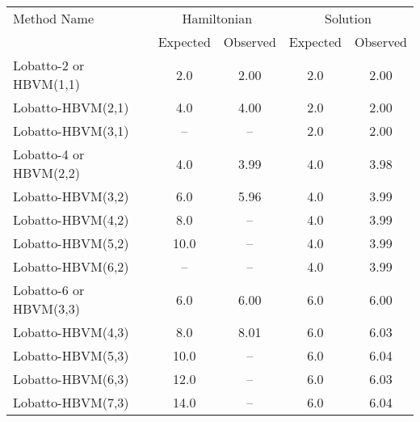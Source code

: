 \begin{tabular}{l|cccc}
\toprule
           Method Name & \multicolumn{2}{c}{Hamiltonian} & \multicolumn{2}{c}{Solution} \\
                       &    Expected & Observed & Expected & Observed \\
\midrule
Lobatto-2 or HBVM(1,1) &         2.0 &     2.00 &      2.0 &     2.00 \\
     Lobatto-HBVM(2,1) &         4.0 &     4.00 &      2.0 &     2.00 \\
     Lobatto-HBVM(3,1) &          -- &       -- &      2.0 &     2.00 \\
Lobatto-4 or HBVM(2,2) &         4.0 &     3.99 &      4.0 &     3.98 \\
     Lobatto-HBVM(3,2) &         6.0 &     5.96 &      4.0 &     3.99 \\
     Lobatto-HBVM(4,2) &         8.0 &       -- &      4.0 &     3.99 \\
     Lobatto-HBVM(5,2) &        10.0 &       -- &      4.0 &     3.99 \\
     Lobatto-HBVM(6,2) &          -- &       -- &      4.0 &     3.99 \\
Lobatto-6 or HBVM(3,3) &         6.0 &     6.00 &      6.0 &     6.00 \\
     Lobatto-HBVM(4,3) &         8.0 &     8.01 &      6.0 &     6.03 \\
     Lobatto-HBVM(5,3) &        10.0 &       -- &      6.0 &     6.04 \\
     Lobatto-HBVM(6,3) &        12.0 &       -- &      6.0 &     6.03 \\
     Lobatto-HBVM(7,3) &        14.0 &       -- &      6.0 &     6.04 \\
\bottomrule
\end{tabular}
